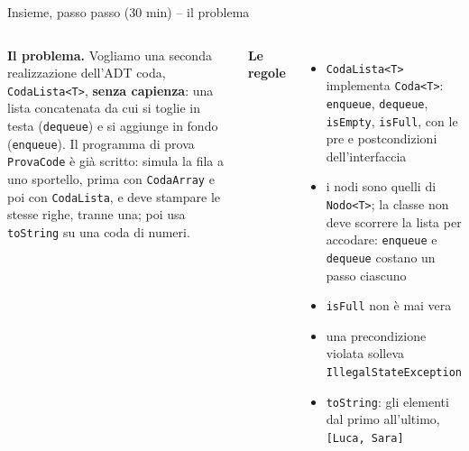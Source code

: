 \documentclass[10pt,aspectratio=169,xcolor={table}]{beamer}
\begin{document}
\begin{frame}[fragile]{Insieme, passo passo (30 min) -- il problema}
\begin{columns}[T]
\footnotesize
\textbf{Il problema.} Vogliamo una seconda realizzazione dell'ADT coda, \texttt{CodaLista<T>}, \textbf{senza capienza}: una lista concatenata da cui si toglie in testa (\texttt{dequeue}) e si aggiunge in fondo (\texttt{enqueue}). Il programma di prova \texttt{ProvaCode} è già scritto: simula la fila a uno sportello, prima con \texttt{CodaArray} e poi con \texttt{CodaLista}, e deve stampare le stesse righe, tranne una; poi usa \texttt{toString} su una coda di numeri.

\vspace{0.1cm}
\textbf{Le regole}
\begin{itemize}\itemsep=2pt
    \item \texttt{CodaLista<T>} implementa \texttt{Coda<T>}: \texttt{enqueue}, \texttt{dequeue}, \texttt{isEmpty}, \texttt{isFull}, con le pre e postcondizioni dell'interfaccia
    \item i nodi sono quelli di \texttt{Nodo<T>}; la classe non deve scorrere la lista per accodare: \texttt{enqueue} e \texttt{dequeue} costano un passo ciascuno
    \item \texttt{isFull} non è mai vera
    \item una precondizione violata solleva \texttt{IllegalStateException}
    \item \texttt{toString}: gli elementi dal primo all'ultimo, \texttt{[Luca, Sara]}
\end{itemize}

\end{columns}
\end{frame}
\end{document}
